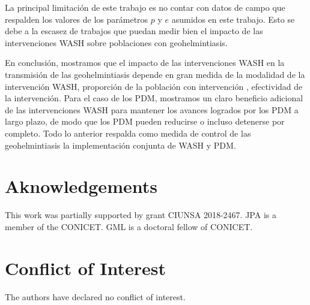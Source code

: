 \documentclass[12pt,a4paper]{article}
\theoremstyle{plain}%
\theoremstyle{definition}
\theoremstyle{remark}
\begin{document}
	La principal limitación de este trabajo es no contar con datos de campo que respalden los valores de los parámetros $p$ y $e$ asumidos en este trabajo. Esto se debe a la escasez de trabajos que puedan medir bien el impacto de las intervenciones WASH sobre poblaciones con geohelmintiasis. 
	
	
	En conclusión, mostramos que el impacto de las intervenciones WASH en la transmisión de las geohelmintiasis depende en gran medida de la modalidad de la intervención WASH, proporción de la población con intervención , efectividad de la intervención.  
	Para el caso de los PDM, mostramos un claro beneficio adicional de las intervenciones WASH para mantener los avances logrados por los PDM a largo plazo, de modo que los PDM pueden reducirse o incluso detenerse por completo. 
	Todo lo anterior respalda como medida de control de las geohelmintiasis la
	implementación conjunta de
	WASH y PDM.
	
		
	
	
	\section*{Aknowledgements}
	
	This work was partially supported by grant CIUNSA 2018-2467. JPA is a member of the CONICET. GML is a doctoral fellow of CONICET.
	
	\section*{Conflict of Interest}
	
	The authors have declared no conflict of interest.
	
	
	
		
	
\end{document}
